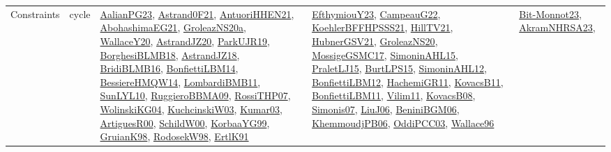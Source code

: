 {\begin{longtable}{lp{3cm}>{\raggedright}p{6cm}>{\raggedright}p{6cm}p{8cm}}
Constraints & cycle & \href{papers/AalianPG23.pdf}{AalianPG23}\cite{AalianPG23}, \href{papers/Astrand0F21.pdf}{Astrand0F21}\cite{Astrand0F21}, \href{papers/AntuoriHHEN21.pdf}{AntuoriHHEN21}\cite{AntuoriHHEN21}, \href{articles/AbohashimaEG21.pdf}{AbohashimaEG21}\cite{AbohashimaEG21}, \href{papers/GroleazNS20a.pdf}{GroleazNS20a}\cite{GroleazNS20a}, \href{articles/WallaceY20.pdf}{WallaceY20}\cite{WallaceY20}, \href{articles/AstrandJZ20.pdf}{AstrandJZ20}\cite{AstrandJZ20}, \href{papers/ParkUJR19.pdf}{ParkUJR19}\cite{ParkUJR19}, \href{articles/BorghesiBLMB18.pdf}{BorghesiBLMB18}\cite{BorghesiBLMB18}, \href{papers/AstrandJZ18.pdf}{AstrandJZ18}\cite{AstrandJZ18}, \href{articles/BridiBLMB16.pdf}{BridiBLMB16}\cite{BridiBLMB16}, \href{articles/BonfiettiLBM14.pdf}{BonfiettiLBM14}\cite{BonfiettiLBM14}, \href{papers/BessiereHMQW14.pdf}{BessiereHMQW14}\cite{BessiereHMQW14}, \href{papers/LombardiBMB11.pdf}{LombardiBMB11}\cite{LombardiBMB11}, \href{papers/SunLYL10.pdf}{SunLYL10}\cite{SunLYL10}, \href{articles/RuggieroBBMA09.pdf}{RuggieroBBMA09}\cite{RuggieroBBMA09}, \href{papers/RossiTHP07.pdf}{RossiTHP07}\cite{RossiTHP07}, \href{papers/WolinskiKG04.pdf}{WolinskiKG04}\cite{WolinskiKG04}, \href{articles/KuchcinskiW03.pdf}{KuchcinskiW03}\cite{KuchcinskiW03}, \href{papers/Kumar03.pdf}{Kumar03}\cite{Kumar03}, \href{articles/ArtiguesR00.pdf}{ArtiguesR00}\cite{ArtiguesR00}, \href{articles/SchildW00.pdf}{SchildW00}\cite{SchildW00}, \href{papers/KorbaaYG99.pdf}{KorbaaYG99}\cite{KorbaaYG99}, \href{papers/GruianK98.pdf}{GruianK98}\cite{GruianK98}, \href{papers/RodosekW98.pdf}{RodosekW98}\cite{RodosekW98}, \href{papers/ErtlK91.pdf}{ErtlK91}\cite{ErtlK91} & \href{papers/EfthymiouY23.pdf}{EfthymiouY23}\cite{EfthymiouY23}, \href{articles/CampeauG22.pdf}{CampeauG22}\cite{CampeauG22}, \href{articles/KoehlerBFFHPSSS21.pdf}{KoehlerBFFHPSSS21}\cite{KoehlerBFFHPSSS21}, \href{papers/HillTV21.pdf}{HillTV21}\cite{HillTV21}, \href{articles/HubnerGSV21.pdf}{HubnerGSV21}\cite{HubnerGSV21}, \href{papers/GroleazNS20.pdf}{GroleazNS20}\cite{GroleazNS20}, \href{papers/MossigeGSMC17.pdf}{MossigeGSMC17}\cite{MossigeGSMC17}, \href{articles/SimoninAHL15.pdf}{SimoninAHL15}\cite{SimoninAHL15}, \href{papers/PraletLJ15.pdf}{PraletLJ15}\cite{PraletLJ15}, \href{papers/BurtLPS15.pdf}{BurtLPS15}\cite{BurtLPS15}, \href{papers/SimoninAHL12.pdf}{SimoninAHL12}\cite{SimoninAHL12}, \href{papers/BonfiettiLBM12.pdf}{BonfiettiLBM12}\cite{BonfiettiLBM12}, \href{articles/HachemiGR11.pdf}{HachemiGR11}\cite{HachemiGR11}, \href{articles/KovacsB11.pdf}{KovacsB11}\cite{KovacsB11}, \href{papers/BonfiettiLBM11.pdf}{BonfiettiLBM11}\cite{BonfiettiLBM11}, \href{papers/Vilim11.pdf}{Vilim11}\cite{Vilim11}, \href{articles/KovacsB08.pdf}{KovacsB08}\cite{KovacsB08}, \href{articles/Simonis07.pdf}{Simonis07}\cite{Simonis07}, \href{papers/LiuJ06.pdf}{LiuJ06}\cite{LiuJ06}, \href{papers/BeniniBGM06.pdf}{BeniniBGM06}\cite{BeniniBGM06}, \href{papers/KhemmoudjPB06.pdf}{KhemmoudjPB06}\cite{KhemmoudjPB06}, \href{papers/OddiPCC03.pdf}{OddiPCC03}\cite{OddiPCC03}, \href{articles/Wallace96.pdf}{Wallace96}\cite{Wallace96} & \href{papers/Bit-Monnot23.pdf}{Bit-Monnot23}\cite{Bit-Monnot23}, \href{articles/AkramNHRSA23.pdf}{AkramNHRSA23}\cite{AkramNHRSA23}, 
\end{longtable}}
